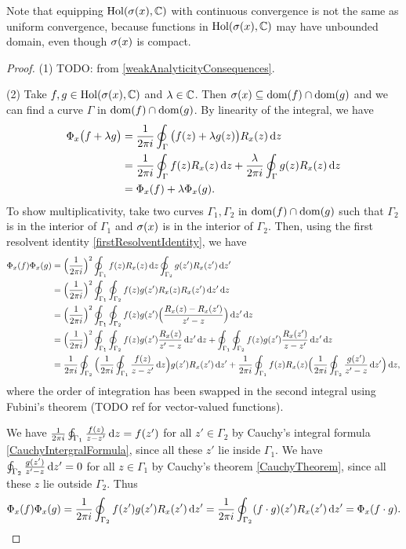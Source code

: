 Note that equipping $\operatorname{Hol}(\sigma(x),\mathbb{C})$ with continuous convergence is not the same as uniform convergence, because functions in $\operatorname{Hol}(\sigma(x),\mathbb{C})$ may have unbounded domain, even though $\sigma(x)$ is compact.
\begin{proof}
(1) TODO: from \ref{weakAnalyticityConsequences}.

(2) Take $f,g \in \operatorname{Hol}(\sigma(x),\mathbb{C})$ and $\lambda\in \mathbb{C}$. Then $\sigma(x) \subseteq \operatorname{dom}(f)\cap \operatorname{dom}(g)$ and we can find a curve $\Gamma$ in $\operatorname{dom}(f)\cap \operatorname{dom}(g)$. By linearity of the integral, we have
\begin{align*}
\Phi_x\big(f+\lambda g\big) &= \frac{1}{2\pi i}\oint_\Gamma \big(f(z)+\lambda g(z)\big)R_x(z)\operatorname{d \!}{z} \\
&= \frac{1}{2\pi i}\oint_\Gamma f(z)R_x(z)\operatorname{d \!}{z} + \frac{\lambda}{2\pi i} \oint_\Gamma g(z)R_x(z)\operatorname{d \!}{z} \\
&= \Phi_x(f) + \lambda \Phi_x(g).
\end{align*}
To show multiplicativity, take two curves $\Gamma_1, \Gamma_2$ in $\operatorname{dom}(f)\cap \operatorname{dom}(g)$ such that $\Gamma_2$ is in the interior of $\Gamma_1$ and $\sigma(x)$ is in the interior of $\Gamma_2$. Then, using the first resolvent identity \ref{firstResolventIdentity}, we have
\begin{align*}
\Phi_x(f)\Phi_x(g) &= \Big(\frac{1}{2\pi i}\Big)^2\oint_{\Gamma_1}f(z)R_x(z)\diff{z}\oint_{\Gamma_2}g(z')R_x(z')\diff{z'} \\
&= \Big(\frac{1}{2\pi i}\Big)^2\oint_{\Gamma_1}\oint_{\Gamma_2}f(z)g(z')R_x(z)R_x(z')\diff{z'}\diff{z} \\
&= \Big(\frac{1}{2\pi i}\Big)^2\oint_{\Gamma_1}\oint_{\Gamma_2}f(z)g(z')\Big(\frac{R_x(z) - R_x(z')}{z'- z}\Big)\diff{z'}\diff{z} \\
&= \Big(\frac{1}{2\pi i}\Big)^2\oint_{\Gamma_1}\oint_{\Gamma_2}f(z)g(z')\frac{R_x(z)}{z'- z}\diff{z'}\diff{z} + \oint_{\Gamma_1}\oint_{\Gamma_2}f(z)g(z')\frac{R_x(z')}{z- z'}\diff{z'}\diff{z} \\
&= \frac{1}{2\pi i}\oint_{\Gamma_2}\Big(\frac{1}{2\pi i}\oint_{\Gamma_1}\frac{f(z)}{z- z'}\diff{z}\Big)g(z')R_x(z')\diff{z'} + \frac{1}{2\pi i}\oint_{\Gamma_1}f(z)R_x(z)\Big(\frac{1}{2\pi i}\oint_{\Gamma_2}\frac{g(z')}{z'- z}\diff{z'}\Big)\diff{z},
\end{align*}
where the order of integration has been swapped in the second integral using Fubini's theorem (TODO ref for vector-valued functions).

We have $\frac{1}{2\pi i}\oint_{\Gamma_1}\frac{f(z)}{z- z'}\operatorname{d \!}{z} = f(z')$ for all $z'\in \Gamma_2$ by Cauchy's integral formula \ref{CauchyIntergralFormula}, since all these $z'$ lie inside $\Gamma_1$. We have $\oint_{\Gamma_2}\frac{g(z')}{z'- z}\operatorname{d \!}{z'} = 0$ for all $z\in \Gamma_1$ by Cauchy's theorem \ref{CauchyTheorem}, since all these $z$ lie outside $\Gamma_2$.
Thus
\[ \Phi_x(f)\Phi_x(g) = \frac{1}{2\pi i}\oint_{\Gamma_2}f(z')g(z')R_x(z')\operatorname{d \!}{z'} = \frac{1}{2\pi i}\oint_{\Gamma_2}(f\cdot g)(z')R_x(z')\operatorname{d \!}{z'} = \Phi_x(f\cdot g). \]


\end{proof}
